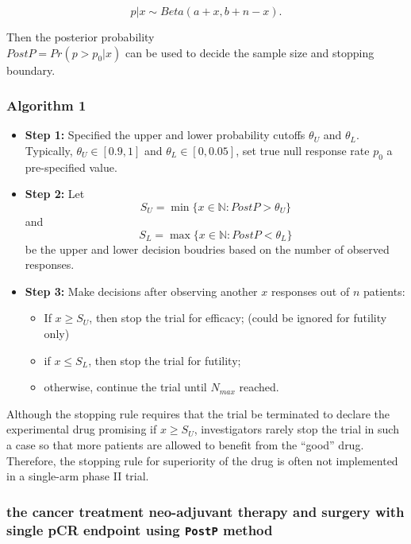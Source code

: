 \documentclass[]{article}
\providecommand{\tightlist}{%
  \setlength{\itemsep}{0pt}\setlength{\parskip}{0pt}}
\begin{document}
\[p|x \sim Beta(a + x, b + n - x).\]

Then the posterior probability\\
\(PostP=Pr(p>p_0|x)\) can be used to decide the sample size and stopping
boundary.

\subsubsection{Algorithm 1}\label{algorithm-1}

\begin{itemize}
\tightlist
\item
  \textbf{Step 1:} Specified the upper and lower probability cutoffs
  \(\theta_U\) and \(\theta_L\). Typically, \(\theta_U \in [0.9,1]\) and
  \(\theta_L \in [0,0.05]\), set true null response rate \(p_0\) a
  pre-specified value.
\item
  \textbf{Step 2:} Let
  \[S_U =\min \{x \in \mathbb{N}:  PostP > \theta_U \}\] and
  \[ S_L =\max \{x \in \mathbb{N}:  PostP < \theta_L \}\] be the upper
  and lower decision boudries based on the number of observed responses.
\item
  \textbf{Step 3:} Make decisions after observing another \(x\)
  responses out of \(n\) patients:

  \begin{itemize}
  \tightlist
  \item
    If \(x \ge S_U\), then stop the trial for efficacy; (could be
    ignored for futility only)
  \item
    if \(x \le S_L\), then stop the trial for futility;
  \item
    otherwise, continue the trial until \(N_{max}\) reached.
  \end{itemize}
\end{itemize}

Although the stopping rule requires that the trial be terminated to
declare the experimental drug promising if \(x \ge S_U\), investigators
rarely stop the trial in such a case so that more patients are allowed
to benefit from the ``good'' drug. Therefore, the stopping rule for
superiority of the drug is often not implemented in a single-arm phase
II trial.

\subsubsection{\texorpdfstring{the cancer treatment neo-adjuvant therapy
and surgery with single pCR endpoint using \texttt{PostP}
method}{the cancer treatment neo-adjuvant therapy and surgery with single pCR endpoint using PostP method}}\label{the-cancer-treatment-neo-adjuvant-therapy-and-surgery-with-single-pcr-endpoint-using-postp-method}
\end{document}
